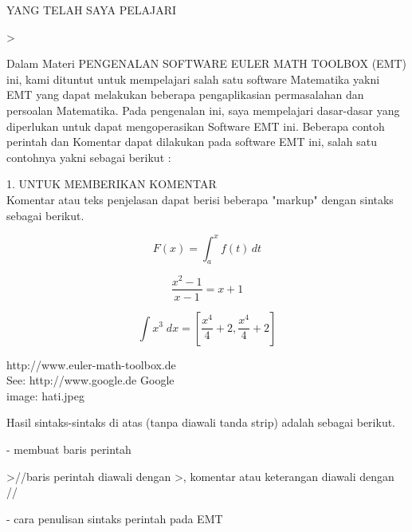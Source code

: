 \documentclass[a4paper,10pt]{article}
\begin{document}
\begin{eulernotebook}
\begin{eulercomment}
\end{eulercomment}
\eulersubheading{}
\begin{eulercomment}
YANG TELAH SAYA PELAJARI
\end{eulercomment}
\begin{eulerprompt}
>  
\end{eulerprompt}
\begin{eulercomment}
Dalam Materi PENGENALAN SOFTWARE EULER MATH TOOLBOX (EMT) ini, kami
dituntut untuk mempelajari salah satu software Matematika yakni EMT
yang dapat melakukan beberapa pengaplikasian permasalahan dan
persoalan Matematika. Pada pengenalan ini, saya mempelajari
dasar-dasar yang diperlukan untuk dapat mengoperasikan Software EMT
ini. Beberapa contoh perintah dan Komentar dapat dilakukan pada
software EMT ini, salah satu contohnya yakni sebagai berikut :

1. UNTUK MEMBERIKAN KOMENTAR\\
Komentar atau teks penjelasan dapat berisi beberapa "markup" dengan
sintaks sebagai berikut.

\begin{eulercomment}
\begin{eulerformula}
\[
F (x) = \int_a^x f (t) \, dt
\]
\end{eulerformula}
\begin{eulerformula}
\[
\frac{x^2-1}{x-1} = x + 1
\]
\end{eulerformula}
\begin{eulerformula}
\[
\int {x^3}{\;dx}=\left[ \frac{x^4}{4}+2 , \frac{x^4}{4}+2 \right] 
\]
\end{eulerformula}
\begin{eulercomment}
http://www.euler-math-toolbox.de\\
See: http://www.google.de \textbar{} Google\\
image: hati.jpeg\\
\end{eulercomment}
\eulersubheading{}
\begin{eulercomment}
Hasil sintaks-sintaks di atas (tanpa diawali tanda strip) adalah
sebagai berikut.

- membuat baris perintah
\end{eulercomment}
\begin{eulerprompt}
>//baris perintah diawali dengan >, komentar atau keterangan diawali dengan //
\end{eulerprompt}
\begin{eulercomment}
- cara penulisan sintaks perintah pada EMT


\end{eulercomment}
\end{eulercomment}
\end{eulercomment}
\end{eulernotebook}
\end{document}
